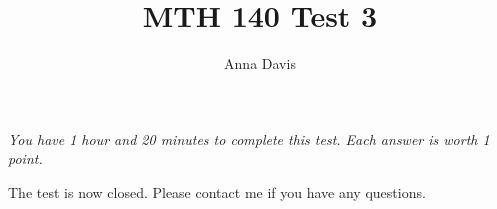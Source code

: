 \documentclass{ximera}
\author{Anna Davis} \title{MTH 140 Test 3}
\begin{document}
\begin{abstract}

\end{abstract}
\maketitle
 \textit{You have 1 hour and 20 minutes to complete this test.  Each answer is worth 1 point.}

The test is now closed.  Please contact me if you have any questions.
\end{document}
